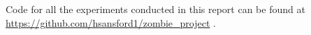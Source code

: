 \documentclass[]{article}
\begin{document}
Code for all the experiments conducted in this report can be found at  \url{https://github.com/hsansford1/zombie_project} .


%
%	
%	
%	
%	
%	
%	
%	
\end{document}
